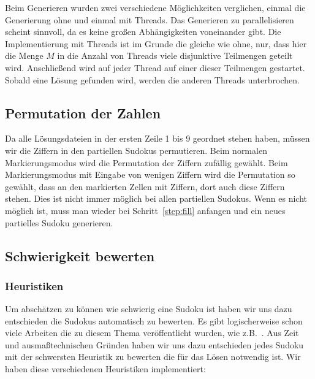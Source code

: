 Beim Generieren wurden zwei verschiedene Möglichkeiten verglichen, einmal die Generierung ohne und einmal mit Threads.
Das Generieren zu parallelisieren scheint sinnvoll, da es keine großen Abhängigkeiten voneinander gibt.
Die Implementierung mit Threads ist im Grunde die gleiche wie ohne, nur, dass hier die Menge $M$ in die Anzahl von Threads viele disjunktive Teilmengen geteilt wird.
Anschließend wird auf jeder Thread auf einer dieser Teilmengen gestartet. Sobald eine Lösung gefunden wird, werden die anderen Threads unterbrochen.

\subsection{Permutation der Zahlen}
Da alle Lösungsdateien in der ersten Zeile 1 bis 9 geordnet stehen haben, müssen wir die Ziffern in den partiellen Sudokus permutieren.
Beim normalen Markierungsmodus wird die Permutation der Ziffern zufällig gewählt.
Beim Markierungsmodus mit Eingabe von wenigen Ziffern wird die Permutation so gewählt, dass an den markierten Zellen mit Ziffern,
dort auch diese Ziffern stehen.
Dies ist nicht immer möglich bei allen partiellen Sudokus.
Wenn es nicht möglich ist, muss man wieder bei Schritt~\ref{step:fill} anfangen und ein neues partielles Sudoku generieren.


\subsection{Schwierigkeit bewerten}
\subsubsection{Heuristiken}
Um abschätzen zu können wie schwierig eine Sudoku ist haben wir uns dazu entschieden die Sudokus automatisch zu bewerten.
Es gibt logischerweise schon viele Arbeiten die zu diesem Thema veröffentlicht wurden, wie z.B.~\cite{Pelanek14}.
Aus Zeit und ausmaßtechnischen Gründen haben wir uns dazu entschieden jedes Sudoku mit der schwersten Heuristik zu bewerten die für das Lösen notwendig ist.
Wir haben diese verschiedenen Heuristiken implementiert:


